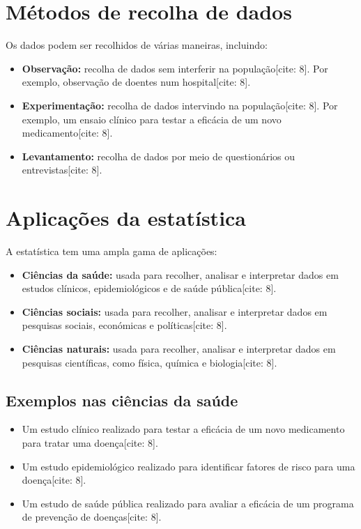 \documentclass[
  brazilian,
  letterpaper,
  DIV=11,
  numbers=noendperiod]{scrreprt}
\providecommand{\tightlist}{%
  \setlength{\itemsep}{0pt}\setlength{\parskip}{0pt}}
\begin{document}
\section{Métodos de recolha de
dados}\label{muxe9todos-de-recolha-de-dados}

Os dados podem ser recolhidos de várias maneiras, incluindo:

\begin{itemize}
\tightlist
\item
  \textbf{Observação:} recolha de dados sem interferir na
  população{[}cite: 8{]}. Por exemplo, observação de doentes num
  hospital{[}cite: 8{]}.
\item
  \textbf{Experimentação:} recolha de dados intervindo na
  população{[}cite: 8{]}. Por exemplo, um ensaio clínico para testar a
  eficácia de um novo medicamento{[}cite: 8{]}.
\item
  \textbf{Levantamento:} recolha de dados por meio de questionários ou
  entrevistas{[}cite: 8{]}.
\end{itemize}

\section{Aplicações da
estatística}\label{aplicauxe7uxf5es-da-estatuxedstica}

A estatística tem uma ampla gama de aplicações:

\begin{itemize}
\tightlist
\item
  \textbf{Ciências da saúde:} usada para recolher, analisar e
  interpretar dados em estudos clínicos, epidemiológicos e de saúde
  pública{[}cite: 8{]}.
\item
  \textbf{Ciências sociais:} usada para recolher, analisar e interpretar
  dados em pesquisas sociais, económicas e políticas{[}cite: 8{]}.
\item
  \textbf{Ciências naturais:} usada para recolher, analisar e
  interpretar dados em pesquisas científicas, como física, química e
  biologia{[}cite: 8{]}.
\end{itemize}

\subsection{Exemplos nas ciências da
saúde}\label{exemplos-nas-ciuxeancias-da-sauxfade}

\begin{itemize}
\tightlist
\item
  Um estudo clínico realizado para testar a eficácia de um novo
  medicamento para tratar uma doença{[}cite: 8{]}.
\item
  Um estudo epidemiológico realizado para identificar fatores de risco
  para uma doença{[}cite: 8{]}.
\item
  Um estudo de saúde pública realizado para avaliar a eficácia de um
  programa de prevenção de doenças{[}cite: 8{]}.
\end{itemize}
\end{document}
